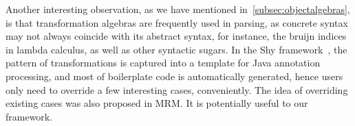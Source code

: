 Another interesting observation, as we have mentioned in~\ref{subsec:objectalgebras}, is that transformation algebras are frequently used in parsing, as concrete syntax may not always coincide with its abstract syntax, for instance, the bruijn indices in lambda calculus, as well as other syntactic sugars. In the Shy framework~\cite{Zhang2015}, the pattern of transformations is captured into a template for Java annotation processing, and most of boilerplate code is automatically generated, hence users only need to override a few interesting cases, conveniently. The idea of overriding existing cases was also proposed in MRM. It is potentially useful to our framework.

